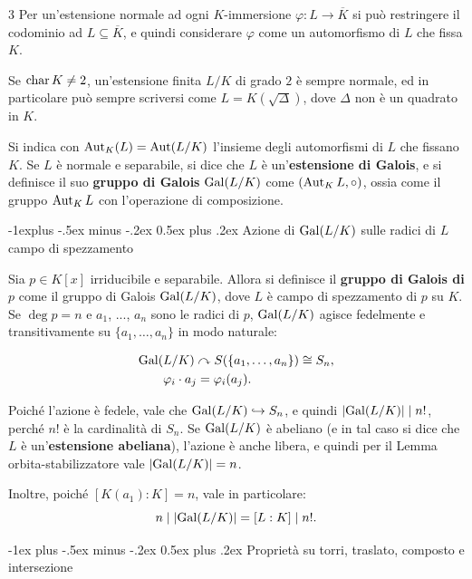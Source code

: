 \documentclass[10pt,landscape]{article}
\makeatletter
\renewcommand{\section}{\@startsection{section}{1}{0mm}%
	{-1ex plus -.5ex minus -.2ex}%
	{0.5ex plus .2ex}%
	{\normalfont\large\bfseries}}
\renewcommand{\subsection}{\@startsection{subsection}{2}{0mm}%
	{-1explus -.5ex minus -.2ex}%
	{0.5ex plus .2ex}%
	{\normalfont\normalsize\bfseries}}
\makeatother
\begin{document}
\begin{multicols}{3}
	Per un'estensione normale ad ogni $K$-immersione
	$\varphi : L \to \overline{K}$ si può restringere
	il codominio ad $L \subseteq \overline{K}$, e quindi considerare $\varphi$ come
	un automorfismo di $L$ che fissa $K$. \smallskip

	Se $\operatorname{char} K \neq 2$, un'estensione finita $L/K$ di grado $2$ è sempre normale,
	ed in particolare può sempre scriversi come
	$L = K(\sqrt{\Delta})$, dove $\Delta$ non è un quadrato
	in $K$. \smallskip

	Si indica con $\operatorname{Aut}_K(L) = \operatorname{Aut}(L / K)$ l'insieme
	degli automorfismi di $L$ che fissano $K$. Se
	$L$ è normale e separabile, si dice che $L$ è
	un'\textbf{estensione di Galois}, e si definisce
	il suo \textbf{gruppo di Galois}
	$\operatorname{Gal}(L / K)$ come $(\Aut_K L, \circ)$, ossia come
	il gruppo $\operatorname{Aut}_K L$ con l'operazione di
	composizione. \smallskip

	\subsection{Azione di \texorpdfstring{$\operatorname{Gal}(L / K)$}{Gal(L/K)} sulle radici di \texorpdfstring{$L$}{L} campo di spezzamento}

	Sia $p \in K[x]$ irriducibile e separabile.
	Allora si definisce
	il \textbf{gruppo di Galois di $p$} come il gruppo
	di Galois $\operatorname{Gal}(L / K)$, dove $L$ è campo di
	spezzamento di $p$ su $K$. Se $\deg p = n$ e
	$a_1$, ..., $a_n$ sono le radici di $p$,
	$\operatorname{Gal}(L / K)$ agisce fedelmente e transitivamente
	su $\{a_1, \ldots, a_n\}$ in modo naturale:

	\begin{equation*}
		\begin{split}
			\operatorname{Gal}( & L / K) \curvearrowright S(\{a_1, \ldots, a_n\}) \cong S_n, \\
			      & \varphi_i \cdot a_j = \varphi_i(a_j).
		\end{split}
	\end{equation*}

	Poiché l'azione è fedele, vale che
	$\operatorname{Gal}(L / K) \hookrightarrow S_n$, e quindi $\left\lvert \operatorname{Gal}(L / K) \right\rvert \mid n!$, perché
	$n!$ è la cardinalità di $S_n$.
	Se $\operatorname{Gal}(L / K)$ è abeliano
	(e in tal caso si dice che $L$ è un'\textbf{estensione abeliana}), l'azione
	è anche libera, e quindi per il Lemma orbita-stabilizzatore vale
	$\left\lvert \operatorname{Gal}(L / K) \right\rvert = n$. \smallskip

	Inoltre, poiché $[K(a_1) : K] = n$, vale in particolare:
	\[ n \mid \left\lvert \operatorname{Gal}(L / K) \right\rvert = [L : K] \mid n!. \]

	\section{Proprietà su torri, traslato, composto e intersezione}


\end{multicols}
\end{document}

